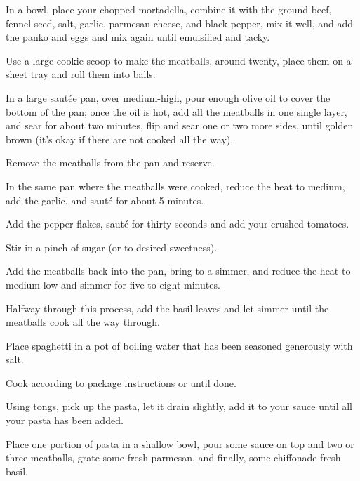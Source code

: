 \begin{method}
    In a bowl, place your chopped mortadella, combine it with the ground beef, fennel seed, salt, garlic, parmesan cheese, and black pepper, mix it well, and add the panko and eggs and mix again until emulsified and tacky.\par
    Use a large cookie scoop to make the meatballs, around twenty, place them on a sheet tray and roll them into balls.\par
    In a large saut\'ee pan, over medium-high, pour enough olive oil to cover the bottom of the pan; once the oil is hot, add all the meatballs in one single layer, and sear for about two minutes, flip and sear one or two more sides, until golden brown (it's okay if there are not cooked all the way).\par
    Remove the meatballs from the pan and reserve.\par

    In the same pan where the meatballs were cooked, reduce the heat to medium, add the garlic, and saut\'e for about 5 minutes.\par
    Add the pepper flakes, saut\'e for thirty seconds and add your crushed tomatoes.\par
    Stir in a pinch of sugar (or to desired sweetness).\par
    Add the meatballs back into the pan, bring to a simmer, and reduce the heat to medium-low and simmer for five to eight minutes.\par
    Halfway through this process, add the basil leaves and let simmer until the meatballs cook all the way through.\par

    Place spaghetti in a pot of boiling water that has been seasoned generously with salt.\par
    Cook according to package instructions or until done.\par
    Using tongs, pick up the pasta, let it drain slightly, add it to your sauce until all your pasta has been added.\par
    Place one portion of pasta in a shallow bowl, pour some sauce on top and two or three meatballs, grate some fresh parmesan, and finally, some chiffonade fresh basil.
\end{method}